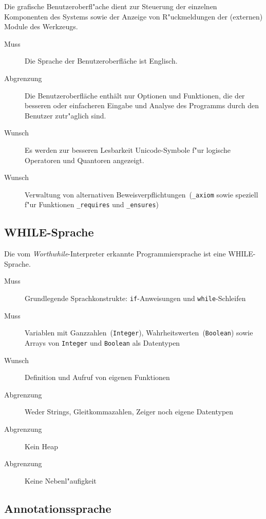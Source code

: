 Die grafische Benutzeroberfl"ache dient zur Steuerung der einzelnen Komponenten des Systems sowie der Anzeige von R"uckmeldungen der (externen) \see Module des Werkzeugs.%

\begin{description}%
    \item [Muss] Die Sprache der Benutzeroberfläche ist Englisch.%
    \item [Abgrenzung] Die Benutzeroberfläche enthält nur Optionen und Funktionen, die der besseren oder einfacheren Eingabe und Analyse des Programms durch den Benutzer zutr"aglich sind.%
    \item [Wunsch] Es werden zur besseren Lesbarkeit \see Unicode-Symbole f"ur \see logische Operatoren und Quantoren angezeigt.%
    \item [Wunsch] Verwaltung von alternativen \see Beweisverpflichtungen~(\texttt{\_axiom} sowie speziell f"ur Funktionen \texttt{\_requires} und \texttt{\_ensures})%
\end{description}%

\subsection{WHILE-Sprache}%

Die vom \textit{Worthwhile}-Interpreter erkannte Programmiersprache ist eine \see WHILE-Sprache.%

\begin{description}%
    \item [Muss] Grundlegende Sprachkonstrukte: \texttt{if}-Anweisungen und \texttt{while}-Schleifen%
    \item [Muss] Variablen mit Ganzzahlen~(\texttt{Integer}), Wahrheitswerten~(\texttt{Boolean}) sowie Arrays von \texttt{Integer} und \texttt{Boolean} als Datentypen%
    \item [Wunsch] Definition und Aufruf von eigenen Funktionen%
    \item [Abgrenzung] Weder Strings, Gleitkommazahlen, Zeiger noch eigene Datentypen%
    \item [Abgrenzung] Kein \see Heap%
    \item [Abgrenzung] Keine \see Nebenl"aufigkeit%
\end{description}%

\subsection{Annotationssprache}%

